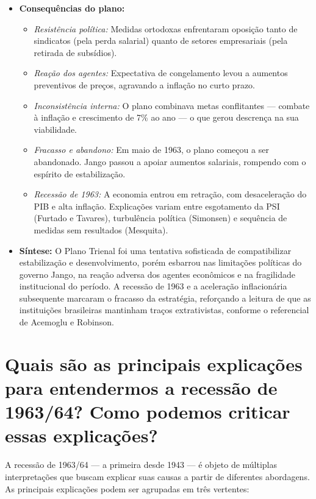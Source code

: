 \documentclass{sciposter}
\begin{document}
\begin{multicols}{3}
\begin{itemize}
    \item \textbf{Consequências do plano:}
    \begin{itemize}
        \item \textit{Resistência política:} Medidas ortodoxas enfrentaram oposição tanto de sindicatos (pela perda salarial) quanto de setores empresariais (pela retirada de subsídios).
        \item \textit{Reação dos agentes:} Expectativa de congelamento levou a aumentos preventivos de preços, agravando a inflação no curto prazo.
        \item \textit{Inconsistência interna:} O plano combinava metas conflitantes — combate à inflação e crescimento de 7\% ao ano — o que gerou descrença na sua viabilidade.
        \item \textit{Fracasso e abandono:} Em maio de 1963, o plano começou a ser abandonado. Jango passou a apoiar aumentos salariais, rompendo com o espírito de estabilização.
        \item \textit{Recessão de 1963:} A economia entrou em retração, com desaceleração do PIB e alta inflação. Explicações variam entre esgotamento da PSI (Furtado e Tavares), turbulência política (Simonsen) e sequência de medidas sem resultados (Mesquita).
    \end{itemize}

    \item \textbf{Síntese:}
    O Plano Trienal foi uma tentativa sofisticada de compatibilizar estabilização e desenvolvimento, porém esbarrou nas limitações políticas do governo Jango, na reação adversa dos agentes econômicos e na fragilidade institucional do período. A recessão de 1963 e a aceleração inflacionária subsequente marcaram o fracasso da estratégia, reforçando a leitura de que as instituições brasileiras mantinham traços extrativistas, conforme o referencial de Acemoglu e Robinson.
\end{itemize}

\section{\textbf{Quais são as principais explicações para entendermos a recessão de 1963/64? Como podemos criticar essas explicações?}}

A recessão de 1963/64 — a primeira desde 1943 — é objeto de múltiplas interpretações que buscam explicar suas causas a partir de diferentes abordagens. As principais explicações podem ser agrupadas em três vertentes:


\end{multicols}
\end{document}

